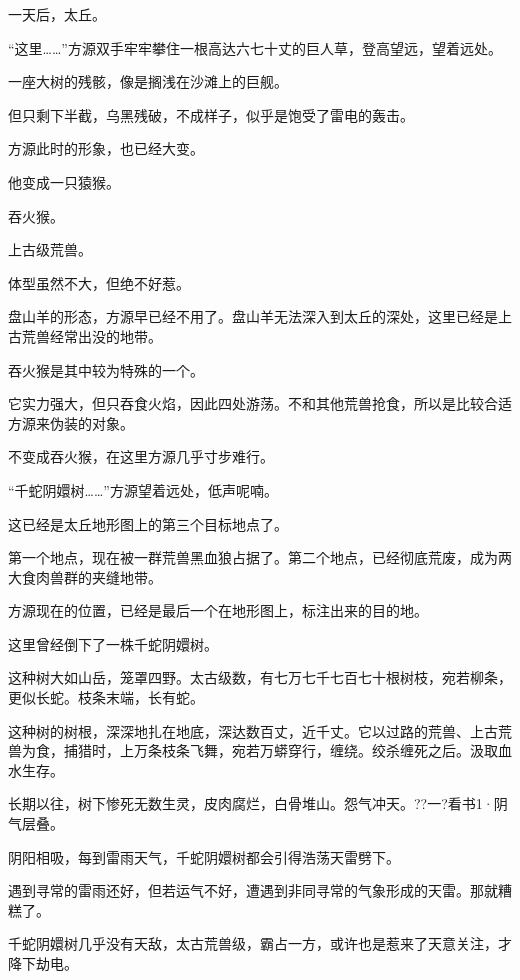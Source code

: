 
\begin{this_body}



一天后，太丘。

“这里……”方源双手牢牢攀住一根高达六七十丈的巨人草，登高望远，望着远处。

一座大树的残骸，像是搁浅在沙滩上的巨舰。

但只剩下半截，乌黑残破，不成样子，似乎是饱受了雷电的轰击。

方源此时的形象，也已经大变。

他变成一只猿猴。

吞火猴。

上古级荒兽。

体型虽然不大，但绝不好惹。

盘山羊的形态，方源早已经不用了。盘山羊无法深入到太丘的深处，这里已经是上古荒兽经常出没的地带。

吞火猴是其中较为特殊的一个。

它实力强大，但只吞食火焰，因此四处游荡。不和其他荒兽抢食，所以是比较合适方源来伪装的对象。

不变成吞火猴，在这里方源几乎寸步难行。

“千蛇阴嬛树……”方源望着远处，低声呢喃。

这已经是太丘地形图上的第三个目标地点了。

第一个地点，现在被一群荒兽黑血狼占据了。第二个地点，已经彻底荒废，成为两大食肉兽群的夹缝地带。

方源现在的位置，已经是最后一个在地形图上，标注出来的目的地。

这里曾经倒下了一株千蛇阴嬛树。

这种树大如山岳，笼罩四野。太古级数，有七万七千七百七十根树枝，宛若柳条，更似长蛇。枝条末端，长有蛇。

这种树的树根，深深地扎在地底，深达数百丈，近千丈。它以过路的荒兽、上古荒兽为食，捕猎时，上万条枝条飞舞，宛若万蟒穿行，缠绕。绞杀缠死之后。汲取血水生存。

长期以往，树下惨死无数生灵，皮肉腐烂，白骨堆山。怨气冲天。??一?看书1·阴气层叠。

阴阳相吸，每到雷雨天气，千蛇阴嬛树都会引得浩荡天雷劈下。

遇到寻常的雷雨还好，但若运气不好，遭遇到非同寻常的气象形成的天雷。那就糟糕了。

千蛇阴嬛树几乎没有天敌，太古荒兽级，霸占一方，或许也是惹来了天意关注，才降下劫电。


\end{this_body}
